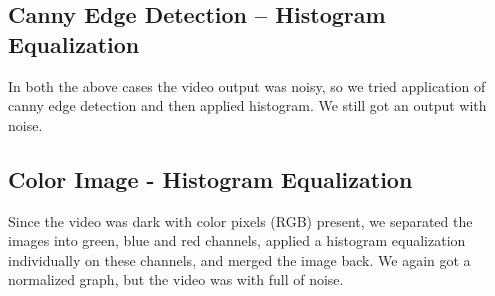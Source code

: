 \documentclass[12pt]{report}
\begin{document}
{\subsection*{Canny Edge Detection – Histogram Equalization} 

In both the above cases the video output was noisy, so we tried application of canny edge detection and then applied histogram. We still got an output with noise.\newline

\subsection*{Color Image - Histogram Equalization}

Since the video was dark with color pixels (RGB) present, we separated the images into green, blue and red channels, applied a histogram equalization individually on these channels, and merged the image back. We again got a normalized graph, but the video was with full of noise. \newline

}
\end{document}
